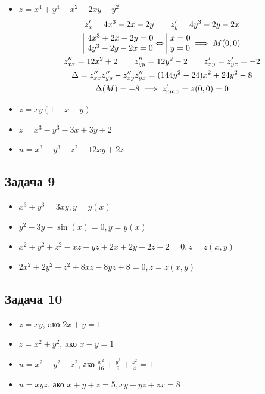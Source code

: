 \documentclass[a4paper,fleqn,12pt]{article}
\theoremstyle{definition}
\begin{document}
\begin{itemize}
\item $z = x^4 + y^4- x^2- 2xy - y^2$
\begin{gather*}
z'_x = 4x^3 + 2x -2y \qquad z'_y = 4y^3 - 2y - 2x \\
\begin{array}{|l@{}}
4x^3 + 2x - 2y = 0 \\
4y^3 - 2y - 2x = 0 
\end{array} \Leftrightarrow 
\begin{array}{|l@{}}
x=0 \\ 
y=0 
\end{array} \implies M(0,0)\\
z''_{xx}  = 12x^2 + 2 \qquad z''_{yy} = 12y^2 - 2 \qquad z'_{xy} = z'_{yx} = -2 \\
\Delta = z''_{xx}z''_{yy} - z''_{xy}z''_{yx} = (144y^2 - 24)x^2 + 24y^2 - 8 \\
\Delta(M) = -8 \implies z'_{max} = z(0,0) = 0
\end{gather*}
\item $z = xy(1 - x - y)$
\item $z = x^3 - y^3 - 3x + 3y + 2$
\item $u = x^3 + y^3 + z^2 - 12xy + 2z$
\end{itemize}

\subsection*{Задача 9}
\begin{itemize}
\item $x^3 + y^3 = 3xy, y = y(x)$
\item $y^2 -3y - \sin(x)= 0, y = y(x)$
\item $x^2 + y^2 + z^2 - xz -yz + 2x + 2y + 2z - 2 = 0, z = z(x,y)$
\item $2x^2 + 2y^2 + z^2 + 8xz -8yz + 8 = 0, z = z(x,y)$
\end{itemize}

\subsection*{Задача 10}

\begin{itemize}
\item $z = xy$, aко $2x+y=1$
\item $z = x^2 + y^2$, aко $x - y =1$
\item $u = x^2 + y^2 + z^2$, ако $\frac{x^2}{16} + \frac{y^2}{9} + \frac{z^2}{4} = 1$
\item $u = xyz$, ако $x + y + z = 5, xy+yz+zx = 8$ 
\end{itemize}
\end{document}
